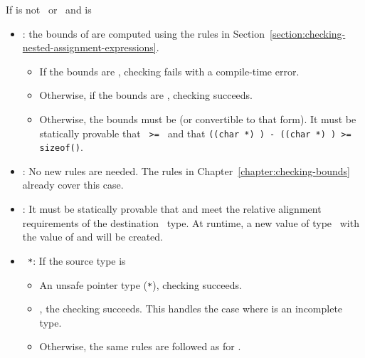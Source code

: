 If  is not \ptrvoid\ or \unsafeptrvoid\ and  is
\begin{itemize}
\item \ptrT: the bounds of  are computed using the rules
in Section~\ref{section:checking-nested-assignment-expressions}.
\begin{itemize}
\item If the bounds are \boundsnone, checking fails with a compile-time
error.
\item Otherwise, if the bounds are \boundsany, checking 
succeeds.
\item Otherwise, the bounds must be  (or convertible
to that form).  It must be statically provable that \texttt{ >= }
and that {\texttt{((char *) ) - ((char *) ) >= sizeof()}}.    
\end{itemize}
\item \arrayptrT: No new rules are needed.   The rules in
Chapter~\ref{chapter:checking-bounds} already cover this case.
\item \spanptrT: It must be statically provable that 
and  meet the relative alignment requirements of
the destination \spanptr\ type.  At runtime, a new value of
type \spanptrT\ with the value of  and  will be created.
\item \texttt{ *}: If the source type  is
\begin{itemize}
\item An unsafe pointer type (\texttt{*}), checking succeeds.
\item \ptrT, the checking succeeds. This handles the case where 
is an incomplete type.
\item Otherwise, the same rules are followed as for \ptrT.
\end{itemize}
\end{itemize}

